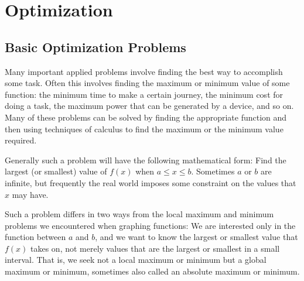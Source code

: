 \chapter{Optimization}

\section{Basic Optimization Problems}



Many important applied problems involve finding the best way to
accomplish some task. Often this involves finding the maximum or
minimum value of some function: the minimum time to make a certain
journey, the minimum cost for doing a task, the maximum power that can
be generated by a device, and so on. Many of these problems can be
solved by finding the appropriate function and then using techniques
of calculus to find the maximum or the minimum value required.

Generally such a problem will have the following mathematical form:
Find the largest (or smallest) value of $f(x)$ when $a\le x\le
b$. Sometimes $a$ or $b$ are infinite, but frequently the real world
imposes some constraint on the values that $x$ may have.

Such a problem differs in two ways from the local maximum and minimum
problems we encountered when graphing functions: We are interested
only in the function between $a$ and $b$, and we want to know the
largest or smallest value that $f(x)$ takes on, not merely values that
are the largest or smallest in a small interval. That is, we seek not
a local maximum or minimum but a {\dfont global\/} maximum or minimum, sometimes also called an {\dfont
absolute\/} maximum or minimum.

